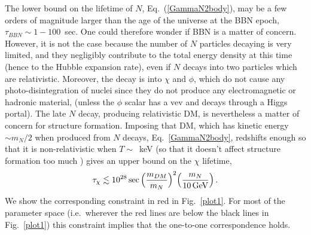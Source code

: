 \documentclass[prd,a4paper,twocolumn,preprintnumbers,nofootinbib,superscriptaddress]{revtex4}
\newcommand{\rupert}[1]{\textcolor{blue}{#1}}
\newcommand{\aritra}[1]{\textcolor{bostonuniversityred}{#1}}
\begin{document}
	
	
	
	
	
The lower bound on the lifetime of $N$, Eq.~(\ref{GammaN2body}), may be a few orders of magnitude larger than the age of the universe at the BBN epoch, $\tau_{BBN}\sim 1-100$~sec. %
One could therefore wonder if BBN is a matter of concern. However, it is not the case because the number of $N$ particles decaying is very limited, and they negligibly contribute to the total energy density at this time (hence to the Hubble expansion rate),  even if $N$ decays into two particles which are relativistic.
Moreover, the decay is into $\chi$ and $\phi$, which do not cause any photo-disintegration of nuclei since they do not produce any electromagnetic or hadronic material, (unless the $\phi$ scalar has a vev and decays through a Higgs portal).
The late $N$ decay, producing relativistic DM, is nevertheless a matter of concern for structure formation. 
Imposing that DM, which has kinetic energy $\sim m_N/2$ when produced from $N$ decays, Eq.~\eqref{GammaN2body}, redshifts enough so that it is non-relativistic when $T\sim $~keV (so that it doesn't affect structure formation too much \cite{Irsic:2017ixq}) gives an upper bound on the $\chi$ lifetime,
\begin{equation}
	\tau_\chi \lesssim 10^{28}\,\hbox{sec}\,\Big(\frac{m_{DM}}{m_N}\Big)^2\Big(\frac{m_N}{10\,\hbox{GeV}}\Big) \, .
	\label{structureformation}
\end{equation}
We show the corresponding constraint in red in  Fig.~\ref{plot1}. 
For most of the parameter space (i.e.~wherever the red lines are below the black lines in Fig.~\ref{plot1}) this constraint implies that the one-to-one correspondence holds.
	
	
	
\end{document}
